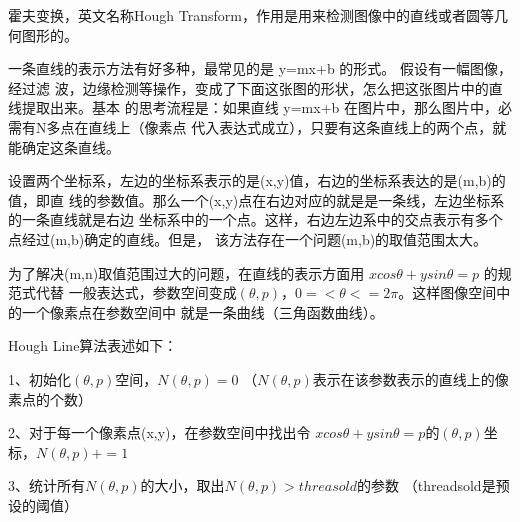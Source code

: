 \documentclass{article}
\begin{document}
    霍夫变换，英文名称Hough Transform，作用是用来检测图像中的直线或者圆等几何图形的。

      一条直线的表示方法有好多种，最常见的是  y=mx+b 的形式。 假设有一幅图像，经过滤
      波，边缘检测等操作，变成了下面这张图的形状，怎么把这张图片中的直线提取出来。基本
      的思考流程是：如果直线 y=mx+b 在图片中，那么图片中，必需有N多点在直线上（像素点
      代入表达式成立），只要有这条直线上的两个点，就能确定这条直线。

      设置两个坐标系，左边的坐标系表示的是(x,y)值，右边的坐标系表达的是(m,b)的值，即直
      线的参数值。那么一个(x,y)点在右边对应的就是是一条线，左边坐标系的一条直线就是右边
      坐标系中的一个点。这样，右边左边系中的交点表示有多个点经过(m,b)确定的直线。但是，
      该方法存在一个问题(m,b)的取值范围太大。

      为了解决(m,n)取值范围过大的问题，在直线的表示方面用 $xcos\theta+ysin\theta=p$ 的规范式代替
      一般表达式，参数空间变成$(\theta,p)$，$0=<\theta<=2\pi$。这样图像空间中的一个像素点在参数空间中
      就是一条曲线（三角函数曲线）。

      Hough Line算法表述如下：

        1、初始化$(\theta,p)$空间，$N(\theta,p)=0$   （$N(\theta,p)$表示在该参数表示的直线上的像素点的个数）

        2、对于每一个像素点(x,y)，在参数空间中找出令 $xcos\theta+ysin\theta=p $的$(\theta,p)$坐标，$N(\theta,p)+=1$

        3、统计所有$N(\theta,p)$的大小，取出$N(\theta,p)>threasold$的参数  （threadsold是预设的阈值）
\end{document}

